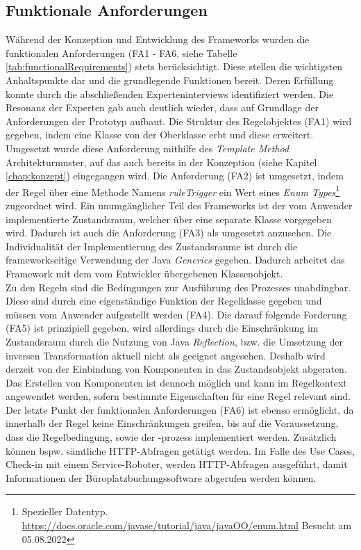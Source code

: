     \subsection*{Funktionale Anforderungen}
        Während der Konzeption und Entwicklung des Frameworks wurden die funktionalen Anforderungen (FA1 - FA6, siehe Tabelle \ref{tab:functionalRequirements}) stets 
        berücksichtigt. Diese stellen die wichtigsten Anhaltspunkte dar und die grundlegende Funktionen bereit. Deren Erfüllung konnte durch die abschließenden 
        Experteninterviews identifiziert werden. Die Resonanz der Experten gab auch deutlich wieder, dass auf Grundlage der Anforderungen der Prototyp aufbaut. Die Struktur 
        des Regelobjektes (FA1) wird gegeben, indem eine Klasse von der Oberklasse erbt und diese erweitert. Umgesetzt wurde diese Anforderung mithilfe des 
        \textit{Template Method} Architekturmuster, auf das auch bereits in der Konzeption (siehe Kapitel \ref{chap:konzept}) eingegangen wird. Die Anforderung (FA2) ist 
        umgesetzt, indem der Regel über eine Methode Namens \textit{ruleTrigger} ein Wert eines \textit{Enum Types}\footnote{Spezieller Datentyp. \url{https://docs.oracle.com/javase/tutorial/java/javaOO/enum.html} Besucht am 05.08.2022} 
        zugeordnet wird. Ein unumgänglicher Teil des Frameworks ist der vom Anwender implementierte Zustandsraum, welcher über eine separate Klasse vorgegeben wird. Dadurch 
        ist auch die Anforderung (FA3) als umgesetzt anzusehen. Die Individualität der Implementierung des Zustandsraume ist durch die frameworkseitige Verwendung der 
        Java \textit{Generics} gegeben. Dadurch arbeitet das Framework mit dem vom Entwickler übergebenen Klassenobjekt. 
        \\
        \linebreak
        Zu den Regeln sind die Bedingungen zur Ausführung des Prozesses unabdingbar. Diese sind durch eine eigenständige Funktion der 
        Regelklasse gegeben und müssen vom Anwender aufgestellt werden (FA4). Die darauf folgende Forderung (FA5) ist prinzipiell gegeben, wird allerdings durch die Einschränkung im 
        Zustandsraum durch die Nutzung von Java \textit{Reflection}, bzw. die Umsetzung der inversen Transformation aktuell nicht als geeignet angesehen. Deshalb wird derzeit von der Einbindung von 
        Komponenten in das Zustandsobjekt abgeraten. Das Erstellen von Komponenten ist dennoch möglich und kann im Regelkontext angewendet werden, sofern bestimmte Eigenschaften für eine Regel relevant sind. Der 
        letzte Punkt der funktionalen Anforderungen (FA6) ist ebenso ermöglicht, da innerhalb der Regel keine Einschränkungen greifen, bis auf die Voraussetzung, dass die Regelbedingung, sowie der -prozess 
        implementiert werden. Zusätzlich können bspw. sämtliche \acs{HTTP}-Abfragen getätigt werden. Im Falle des Use Cases, Check-in mit einem Service-Roboter, werden \acs{HTTP}-Abfragen ausgeführt, damit 
        Informationen der Büroplatzbuchungssoftware abgerufen werden können. 

